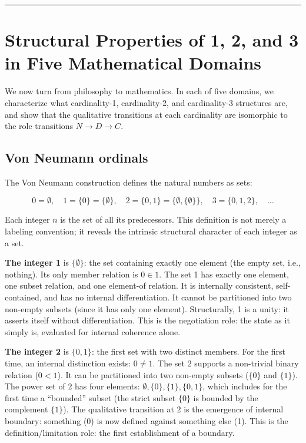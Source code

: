 \documentclass[12pt]{article}
\begin{document}
\begin{center}\rule{0.5\linewidth}{0.5pt}\end{center}

\section{Structural Properties of 1, 2, and 3 in Five Mathematical Domains}\label{structural-properties-of-1-2-and-3-in-five-mathematical-domains}

We now turn from philosophy to mathematics. In each of five domains, we
characterize what cardinality-1, cardinality-2, and cardinality-3
structures are, and show that the qualitative transitions at each
cardinality are isomorphic to the role transitions \(N \to D \to C\).

\subsection{Von Neumann ordinals}\label{von-neumann-ordinals}

The Von Neumann construction defines the natural numbers as sets:

\[0 = \emptyset, \quad 1 = \{0\} = \{\emptyset\}, \quad 2 = \{0,1\} = \{\emptyset, \{\emptyset\}\}, \quad 3 = \{0,1,2\}, \quad \ldots\]

Each integer \(n\) is the set of all its predecessors. This definition
is not merely a labeling convention; it reveals the intrinsic structural
character of each integer as a set.

\textbf{The integer 1} is \(\{\emptyset\}\): the set containing exactly
one element (the empty set, i.e., nothing). Its only member relation is
\(0 \in 1\). The set 1 has exactly one element, one subset relation, and
one element-of relation. It is internally consistent, self-contained,
and has no internal differentiation. It cannot be partitioned into two
non-empty subsets (since it has only one element). Structurally, 1 is a
unity: it asserts itself without differentiation. This is the
negotiation role: the state as it simply is, evaluated for internal
coherence alone.

\textbf{The integer 2} is \(\{0, 1\}\): the first set with two distinct
members. For the first time, an internal distinction exists:
\(0 \neq 1\). The set 2 supports a non-trivial binary relation
(\(0 < 1\)). It can be partitioned into two non-empty subsets (\(\{0\}\)
and \(\{1\}\)). The power set of 2 has four elements:
\(\emptyset, \{0\}, \{1\}, \{0,1\}\), which includes for the first time
a ``bounded'' subset (the strict subset \(\{0\}\) is bounded by the
complement \(\{1\}\)). The qualitative transition at 2 is the emergence
of internal boundary: something (0) is now defined against something
else (1). This is the definition/limitation role: the first
establishment of a boundary.
\end{document}
